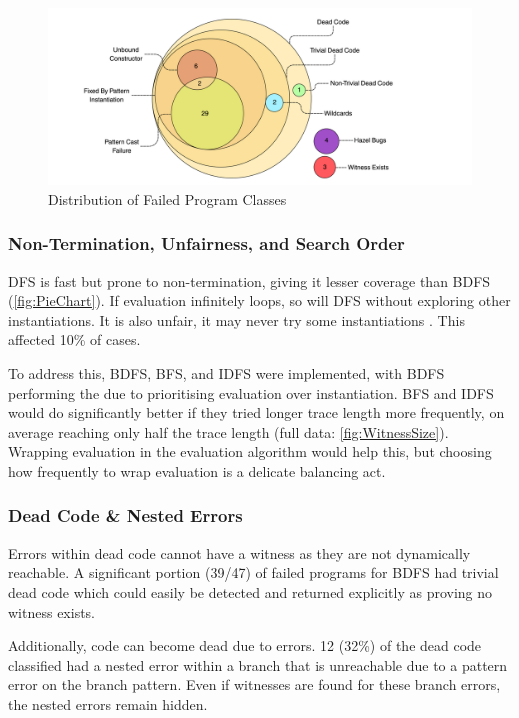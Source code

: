 \begin{figure}[h]
\centering
\includegraphics[width=1\textwidth]{Media/Figures/Failures}
\caption{Distribution of Failed Program Classes}
\label{fig:FailureDistribution}
\end{figure}

\label{sec:SearchCategories}
\subsubsection{Non-Termination, Unfairness, and Search Order}
DFS is fast but prone to non-termination, giving it lesser coverage than BDFS (\cref{fig:PieChart}). If evaluation infinitely loops, so will DFS without exploring other instantiations. It is also unfair, it may never try some instantiations \cite{FairNondeterminism}. This affected 10\% of cases.

To address this, BDFS, BFS, and IDFS were implemented, with BDFS performing the due to prioritising evaluation over instantiation. BFS and IDFS would do significantly better if they tried longer trace length more frequently, on average reaching only half the trace length (full data: \cref{fig:WitnessSize}). Wrapping evaluation in the evaluation algorithm would help this, but choosing how frequently to wrap evaluation is a delicate balancing act.

\subsubsection{Dead Code \& Nested Errors}

Errors within dead code cannot have a witness as they are not dynamically reachable. A significant portion (39/47) of failed programs for BDFS had trivial dead code which could easily be detected and returned explicitly as proving no witness exists.

Additionally, code can become dead due to errors. 12 (32\%) of the dead code classified had a nested error within a branch that is unreachable due to a pattern error on the branch pattern. Even if witnesses are found for these branch errors, the nested errors remain hidden.

